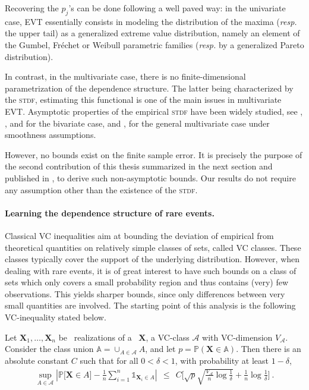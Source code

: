 Recovering the $p_j$'s can be done following a well paved way: in the univariate case, \textsc{EVT} essentially consists in modeling the distribution of the maxima (\emph{resp.} the upper tail) as a generalized extreme value distribution, namely an element of the Gumbel, Fréchet or Weibull parametric families (\emph{resp.} by a generalized Pareto distribution).

In contrast, in the multivariate case, there is no finite-dimensional parametrization of the dependence structure. 
The latter being characterized by the \textsc{stdf}, estimating this functional is one of the main issues in multivariate \textsc{EVT}. Asymptotic properties of the empirical \textsc{stdf} have been widely studied, see \cite{Huangphd}, \cite{Drees98}, \cite{Embrechts2000} and \cite{dHF06} for the bivariate case, and \cite{Qi97}, \cite{Einmahl2012} for the general multivariate case under smoothness assumptions.

However, no bounds exist on the finite sample error. It is precisely the purpose of the second contribution of this thesis summarized in the next section and published in \cite{COLT15}, to derive such non-asymptotic bounds. Our results do not require any assumption other than the existence of the \textsc{stdf}. 




\paragraph{Learning the dependence structure of rare events.}
Classical VC inequalities aim at bounding the deviation of empirical from theoretical quantities on relatively simple classes of sets, called VC classes. These classes typically cover the support of the underlying distribution.  However, when dealing with rare events, it is of great interest to have such bounds on a class of sets which only covers a small probability region and thus contains (very) few observations. This yields sharper bounds, since only differences  between very small quantities are involved. The starting point of this analysis is the following VC-inequality stated below.
\begin{theorem}
\label{thm-princ} 
Let $\mathbf{X}_1,\ldots,\mathbf{X}_n$ be \iid~realizations of a \rv~$\mathbf{X}$, a VC-class $\mathcal{A}$ with VC-dimension $V_{\mathcal{A}}$. %
Consider the class union $\mathbb{A} = \cup_{A \in \mathcal{A}} A$,
 and let  
$p = \mathbb{P}(\mathbf{X} \in \mathbb{A})$. Then there is an absolute constant $C$ such that for all $0<\delta<1$, with probability at least $1-\delta$,
\begin{align*}
\sup_{A \in \mathcal{A}} \left| \mathbb{P} \big[\mathbf{X} \in A\big] - \frac{1}{n} \sum_{i=1}^n \mathds{1}_{\mathbf{X}_i \in A}  \right| ~~\le~~ C \bigg[ \sqrt{p}\sqrt{\frac{V_{\mathcal{A}}}{n} \log{\frac{1}{\delta}}} + \frac{1}{n} \log{\frac{1}{\delta}} \bigg]~.
\end{align*}
\end{theorem}


